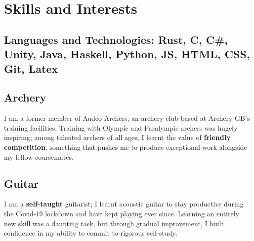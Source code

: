 \documentclass{article}
\newcommand{\indentedblock}[1]{
    \hfill
    \begin{minipage}{\dimexpr\textwidth - 1.95em}
        #1
    \end{minipage}
}
\begin{document}
\section*{Skills and Interests}

\subsection*{\textbf{Languages and Technologies}: Rust, C, C\#, Unity, Java, Haskell, Python, JS, HTML, CSS, Git, Latex}
\vspace{0.5em}

\subsection*{\textbf{Archery}}
\vspace{-0.5em}
\indentedblock{
    I am a former member of Audco Archers, an archery club based at Archery GB's training facilities.
    Training with Olympic and Paralympic archers was hugely inspiring; among talented archers of all ages, 
    I learnt the value of \textbf{friendly competition}, something that pushes me to produce exceptional work alongside 
    my fellow coursemates.
}

\subsection*{\textbf{Guitar}}
\vspace{-0.5em}
\indentedblock{
    I am a \textbf{self-taught} guitarist; I learnt acoustic guitar to stay productive during the Covid-19 lockdown and have kept playing ever since. 
    Learning an entirely new skill was a daunting task, but through gradual improvement, I built confidence in my ability to commit 
    to rigorous self-study.
}
\end{document}
